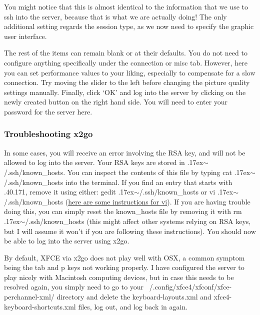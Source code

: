 \documentclass[final,titlepage,letterpaper,oneside,12pt]{article}
\renewcommand{\texttt}[2][BrickRed]{\textcolor{#1}{\ttfamily #2}}%
\newcommand{\atilde}{\raise.17ex\hbox{$\scriptstyle\mathtt{\sim}$}}
\begin{document}
You might notice that this is almost identical to the information that we use to \texttt{ssh} into the server, because that is what we are actually doing! The only additional setting regards the \texttt{session type}, as we now need to specify the graphic user interface.

The rest of the items can remain blank or at their defaults. You do not need to configure anything specifically under the connection or misc tab. However, here you can set performance values to your liking, especially to compensate for a slow connection. Try moving the slider to the left before changing the picture quality settings manually. Finally, click `OK' and log into the server by clicking on the newly created button on the right hand side. You will need to enter your password for the server here.

\subsubsection{Troubleshooting x2go}


In some cases, you will receive an error involving the RSA key, and will not be allowed to log into the server. Your RSA keys are stored in \texttt{\atilde/.ssh/known\_hosts}. You can inspect the contents of this file by typing \texttt{cat \atilde/.ssh/known\_hosts} into the terminal. If you find an entry that starts with \texttt{130.63.40.171}, remove it using either: \texttt{gedit \atilde/.ssh/known\_hosts} or \texttt{vi \atilde/.ssh/known\_hosts} (\href{http://glaciated.org/vi/}{here are some instructions for vi}). If you are having trouble doing this, you can simply reset the \texttt{known\_hosts} file by removing it with \texttt{rm \atilde/.ssh/known\_hosts} (this might affect other systems relying on RSA keys, but I will assume it won't if you are following these instructions). You should now be able to log into the server using x2go.


By default, XFCE via x2go does not play well with OSX, a common symptom being the \texttt{tab} and \texttt{p} keys not working properly. I have configured the server to play nicely with Macintosh computing devices, but in case this needs to be resolved again, you simply need to go to your \texttt{~/.config/xfce4/xfconf/xfce-perchannel-xml/} directory and delete the \texttt{keyboard-layouts.xml} and \texttt{xfce4-keyboard-shortcuts.xml} files, log out, and log back in again.
\end{document}
